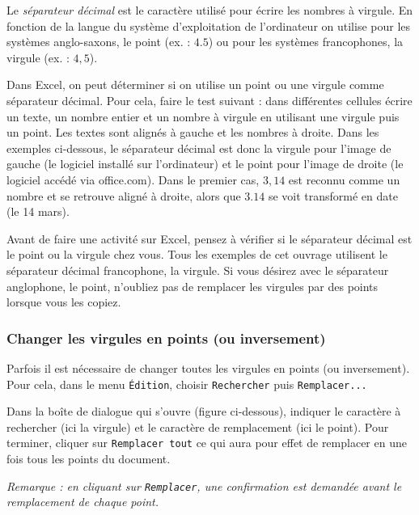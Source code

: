 Le \emph{séparateur décimal} est le caractère utilisé pour écrire les nombres à virgule. En fonction de la langue du système d'exploitation de l'ordinateur on utilise pour les systèmes anglo-saxons, le point (ex. : $4.5$) ou pour les systèmes francophones, la virgule (ex. : $4,5$).

\vspace{6pt}

Dans Excel, on peut déterminer si on utilise un point ou une virgule comme séparateur décimal. Pour cela, faire le test suivant : dans différentes cellules écrire un texte, un nombre entier et un nombre à virgule en utilisant une virgule puis un point. Les textes sont alignés à gauche et les nombres à droite. Dans les exemples ci-dessous, le séparateur décimal est donc la virgule pour l'image de gauche (le logiciel installé sur l'ordinateur) et le point pour l'image de droite (le logiciel accédé via office.com). Dans le premier cas, $3,14$ est reconnu comme un nombre et se retrouve aligné à droite, alors que $3.14$ se voit transformé en date (le 14 mars).


Avant de faire une activité sur Excel, pensez à vérifier si le séparateur décimal est le point ou la virgule chez vous. Tous les exemples de cet ouvrage utilisent le séparateur décimal francophone, la virgule. Si vous désirez avec le séparateur anglophone, le point, n'oubliez pas de remplacer les virgules par des points lorsque vous les copiez.

\subsubsection{Changer les virgules en points (ou inversement)}

Parfois il est nécessaire de changer toutes les virgules en points (ou inversement). Pour cela, dans le menu \texttt{Édition}, choisir \texttt{Rechercher} puis \texttt{Remplacer...}


Dans la boîte de dialogue qui s'ouvre (figure ci-dessous), indiquer le caractère à rechercher  (ici la virgule) et le caractère de remplacement  (ici le point). Pour terminer, cliquer sur \texttt{Remplacer tout}  ce qui aura pour effet de remplacer en une fois tous les points du document.

\emph{Remarque : en cliquant sur \texttt{Remplacer}, une confirmation est demandée avant le remplacement de chaque point.}

